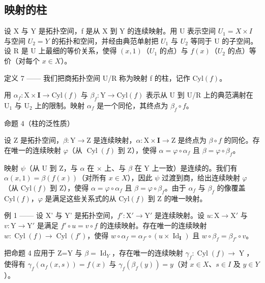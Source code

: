 \subsection{映射的柱}

设 X 与 Y 是拓扑空间，f 是从 X 到 Y 的连续映射。用 U 表示空间 \(U_{1} = X \times I\) 与空间 \(U_{2} = Y\) 的拓扑和空间，并经由典范单射把 \(U_{1}\) 与 \(U_{2}\) 等同于 U 的子空间。设 R 是 U 上最细的等价关系，使得 \((x,1)\)（\(U_{1}\) 的点）与 \(f(x)\)（\(U_{2}\) 的点）等价（对每个 \(x \in X\)）。

定义 7 —— 我们把商拓扑空间 U/R 称为映射 f 的柱，记作 \(\mathrm{Cyl}(f)\)。

用 \(\alpha_{f}\colon\mathrm{X}\times\mathbf{I}\to\mathrm{Cyl}(f)\) 与 \(\beta_{f}\colon\mathrm{Y}\to\mathrm{Cyl}(f)\) 表示从 U 到 U/R 上的典范满射在 \(\mathrm{U}_{1}\) 与 \(\mathrm{U}_{2}\) 上的限制。映射 \(\alpha_{f}\) 是一个同伦，其终点为 \(\beta_{f}\circ f\)。

命题 4（柱的泛性质）

设 Z 是拓扑空间，\(\beta: \mathrm{Y} \to \mathrm{Z}\) 是连续映射，\(\alpha: \mathrm{X} \times \mathbf{I} \to \mathrm{Z}\) 是终点为 \(\beta \circ f\) 的同伦。存在唯一的连续映射 \(\varphi\)（从 \(\operatorname{Cyl}(f)\) 到 Z），使得 \(\alpha = \varphi \circ \alpha_f\) 且 \(\beta = \varphi \circ \beta_f\)。

映射 \(\psi\)（从 U 到 Z，与 \(\alpha\) 在 \(\times\) 上、与 \(\beta\) 在 Y 上一致）是连续的。我们有 \(\alpha(x,1)=\beta(f(x))\)（对所有 \(x\in X\)），因此 \(\psi\) 过渡到商，给出连续映射 \(\varphi\)（从 \(\mathrm{Cyl}(f)\) 到 Z），使得 \(\alpha=\varphi\circ\alpha_{f}\) 且 \(\beta=\varphi\circ\beta_{f}\)。由于 \(\alpha_{f}\) 与 \(\beta_{f}\) 的像覆盖 \(\mathrm{Cyl}(f)\)，\(\varphi\) 是满足这些关系式的从 \(\mathrm{Cyl}(f)\) 到 Z 的唯一映射。

例 1 —— 设 X' 与 Y' 是拓扑空间，\(f': \mathrm{X}' \to \mathrm{Y}'\) 是连续映射。设 \(u: \mathrm{X} \to \mathrm{X}'\) 与 \(v: \mathrm{Y} \to \mathrm{Y}'\) 是满足 \(f' \circ u = v \circ f\) 的连续映射。存在唯一的连续映射 \(w: \operatorname{Cyl}(f) \to \operatorname{Cyl}(f')\)，使得 \(w \circ \alpha_f = \alpha_{f'} \circ (u \times \operatorname{Id}_\mathbf{I})\) 且 \(w \circ \beta_f = \beta_{f'} \circ v\)。

把命题 4 应用于 Z=Y 与 \(\beta = \operatorname{Id}_{Y}\)，存在唯一的连续映射 \(\gamma_{f}\colon\operatorname{Cyl}(f)\to\operatorname{Y}\)，使得有 \(\gamma_{f}(\alpha_{f}(x,s))=f(x)\) 与 \(\gamma_{f}(\beta_{f}(y))=y\)（对 \(x\in X\)、\(s\in I\) 及 \(y\in Y\)）。

